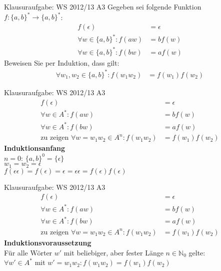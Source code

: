 \begin{frame}{Klausuraufgabe: WS 2012/13 A3}
  Gegeben sei folgende Funktion $f:\{a,b\}^*\rightarrow\{a,b\}^*$:
  \begin{align*}
    f(\epsilon)&=\epsilon\\
    \forall w\in\{a,b\}^*: f(aw)&=bf(w)\\
    \forall w\in\{a,b\}^*: f(bw)&=af(w)
  \end{align*}
  Beweisen Sie per Induktion, dass gilt:
  \begin{align*}
    \forall w_1,w_2\in\{a,b\}^*: f(w_1w_2)&=f(w_1)f(w_2)
  \end{align*}
\end{frame}

\begin{frame}[t]{Klausuraufgabe: WS 2012/13 A3}
  \begin{align*}
    f(\epsilon)&=\epsilon\\
    \forall w\in A^*: f(aw)&=bf(w)\\
    \forall w\in A^*: f(bw)&=af(w)\\
    \text{zu zeigen }\forall w=w_1w_2\in A^n: f(w_1w_2)&=f(w_1)f(w_2)
  \end{align*}
  \pause
  \textbf{Induktionsanfang}\\
  $n=0$: $\{a,b\}^0=\{\epsilon\}$\\
  \pause
  $w_1=w_2=\epsilon$\\
  \pause
  $f(\epsilon\epsilon)=f(\epsilon)=\epsilon=\epsilon\epsilon=f(\epsilon)f(\epsilon)$
\end{frame}

\begin{frame}[t]{Klausuraufgabe: WS 2012/13 A3}
  \begin{align*}
    f(\epsilon)&=\epsilon\\
    \forall w\in A^*: f(aw)&=bf(w)\\
    \forall w\in A^*: f(bw)&=af(w)\\
    \text{zu zeigen }\forall w=w_1w_2\in A^n: f(w_1w_2)&=f(w_1)f(w_2)
  \end{align*}
  \textbf{Induktionsvoraussetzung}\\
  Für alle Wörter $w'$ mit beliebiger, aber fester Länge $n\in\mathbb{N}_0$ gelte:\\
  $\forall w'\in A^*$ mit $w'=w_1w_2: f(w_1w_2)=f(w_1)f(w_2)$
\end{frame}

